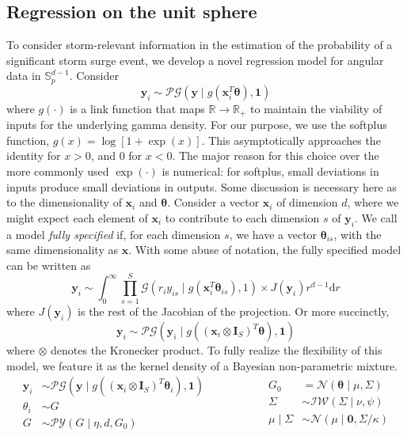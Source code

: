\subsection{Regression on the unit sphere\label{sec:regression}}
To consider storm-relevant information in the estimation of the probability of a significant 
    storm surge event, we develop a novel regression model for angular data in $\mathbb{S}_p^{d-1}$.  
    Consider
    \[
        \bm{y}_i \sim \mathcal{PG}(\bm{y}\mid g(\bm{x}_i^T\bm{\theta}), \bm{1})    
    \]
    where $g(\cdot)$ is a link function that maps $\mathbb{R}\to\mathbb{R}_+$ to maintain the
    viability of inputs for the underlying gamma density.  For our purpose, we use the softplus
    function, $g(x) = \log[1 + \exp(x)]$.  This asymptotically approaches the identity for $x > 0$, and 
    0 for $x < 0$. The major reason for this choice over the more commonly used $\exp(\cdot)$ is 
    numerical: for softplus, small deviations in inputs produce small deviations in outputs. Some 
    discussion is necessary here as to the dimensionality of $\bm{x}_i$ and $\bm{\theta}$. 
    Consider a vector $\bm{x}_i$ of dimension $d$, where we might expect each element of $\bm{x}_i$ 
    to contribute to each dimension $s$ of $\bm{y}_i$.  We call a model \emph{fully specified} if, 
    for each dimension $s$, we have a vector $\bm{\theta}_{is}$, with the same dimensionality as 
    $\bm{x}$. With some abuse of notation, the fully specified model can be written as
    \[
        \bm{y}_i \sim \int_0^{\infty}
            \prod_{s = 1}^S \mathcal{G}\left(r_iy_{is}\mid 
                g(\bm{x}_i^T\bm{\theta}_{is}), 1\right) \times J(\bm{y}_i) r^{d-1}\text{d}r
    \]
    where $J(\bm{y}_i)$ is the rest of the Jacobian of the projection.  Or more succinctly, 
    \[
        \bm{y}_i \sim \mathcal{PG}\left(\bm{y}_i \mid g((\bm{x}_i 
            \otimes \bm{I}_{S})^T\bm{\theta}), \bm{1}\right)
    \]
    where $\otimes$ denotes the Kronecker product.  To fully realize the flexibility of this model,
    we feature it as the kernel density of a Bayesian non-parametric mixture.
    \begin{equation}
        \label{eqn:regressionmodel}
        \begin{aligned}
            \bm{y}_i &\sim \mathcal{PG}\left(\bm{y}\mid 
                g\left((\bm{x}_i\otimes\bm{I}_S)^T\bm{\theta}_i\right), \bm{1}\right)\\
            \theta_i &\sim G\\
            G &\sim \mathcal{PY}(G\mid\eta, d, G_0)
        \end{aligned}
        ~\hspace{2cm}
        \begin{aligned}
            G_0 &= \mathcal{N}(\bm{\theta} \mid \mu, \Sigma)\\
            \Sigma &\sim \mathcal{IW}(\Sigma\mid \nu, \psi)\\
            \mu\mid\Sigma &\sim \mathcal{N}(\mu\mid \bm{0}, \Sigma / \kappa)
        \end{aligned}
    \end{equation}
